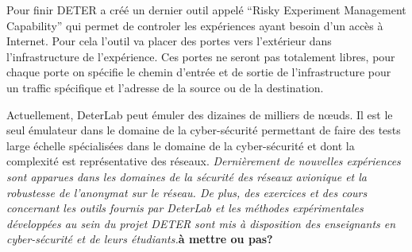 Pour finir DETER a créé un dernier outil appelé ``Risky Experiment Management
Capability'' qui permet de controler les expériences ayant besoin d'un accès à
Internet. Pour cela l'outil va placer des portes vers l'extérieur dans
l'infrastructure de l'expérience. Ces portes ne seront pas totalement libres,
pour chaque porte on spécifie le chemin d'entrée et de sortie de
l'infrastructure pour un traffic spécifique et l'adresse de la source ou de la
destination.

 Actuellement, DeterLab peut émuler des dizaines de milliers de n\oe uds. Il est
 le seul émulateur dans le domaine de la cyber-sécurité permettant de faire des
 tests large échelle spécialisées dans le domaine de la cyber-sécurité et dont
 la complexité est représentative des réseaux. \textit{Dernièrement de nouvelles
 expériences sont apparues dans les domaines de la sécurité des réseaux
 avionique et la robustesse de l'anonymat sur le réseau. De plus, des exercices
 et des cours concernant les outils fournis par DeterLab et les méthodes
 expérimentales développées au sein du projet DETER sont mis à disposition des
 enseignants en cyber-sécurité et de leurs étudiants.}\textbf{à mettre ou pas?}
